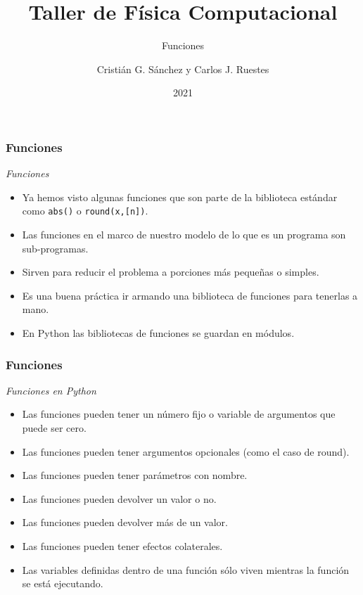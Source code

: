 \documentclass{beamer}
\title{Taller de Física Computacional}
\subtitle{Funciones}
\author{Cristián G. Sánchez y Carlos J. Ruestes}
\date{2021}
\begin{document}
\frame{\titlepage}

\begin{frame}[fragile]
\frametitle{Funciones}
\begin{block}{{\em Funciones}}
\begin{itemize}
\item Ya hemos visto algunas funciones que son parte de la biblioteca estándar como  \texttt{abs()} o \texttt{round(x,[n])}.
\item Las funciones en el marco de nuestro modelo de lo que es un programa son sub-programas.
\item Sirven para reducir el problema a porciones más pequeñas o simples.
\item Es una buena práctica ir armando una biblioteca de funciones para tenerlas a mano.
\item En Python las bibliotecas de funciones se guardan en \alert{módulos}.
\end{itemize}
\end{block}
\end{frame}

\begin{frame}[fragile]
\frametitle{Funciones}
\begin{block}{{\em Funciones en Python}}
\begin{itemize}
\item Las funciones pueden tener un número fijo o variable de argumentos que puede ser cero.
\item Las funciones pueden tener argumentos opcionales (como el caso de round).
\item Las funciones pueden tener parámetros con nombre.
\item Las funciones pueden devolver un valor o no.
\item Las funciones pueden devolver más de un valor.
\item Las funciones pueden tener \alert{efectos colaterales}.
\item Las variables definidas dentro de una función sólo viven mientras la función se está ejecutando.
\end{itemize}
\end{block}
\end{frame}
\end{document}
